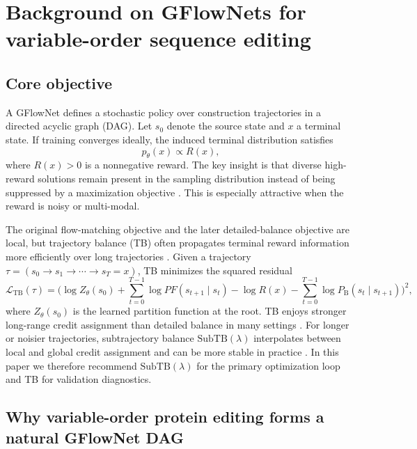 \documentclass[11pt]{article}
\newcommand{\PF}{\ensuremath{PF}}
\newcommand{\PB}{\ensuremath{P_{\mathrm B}}}
\newcommand{\SubTB}{\ensuremath{\mathrm{SubTB}}}
\begin{document}
	
	\section{Background on GFlowNets for variable-order sequence editing}
	\label{sec:gfnbackground}
	
	\subsection{Core objective}
	
	A GFlowNet defines a stochastic policy over construction trajectories in a directed acyclic graph (DAG). Let $s_0$ denote the source state and $x$ a terminal state. If training converges ideally, the induced terminal distribution satisfies
	\begin{equation}
		p_\theta(x) \propto R(x),
	\end{equation}
	where $R(x) > 0$ is a nonnegative reward. The key insight is that diverse high-reward solutions remain present in the sampling distribution instead of being suppressed by a maximization objective \citep{bengio2023gflownet}. This is especially attractive when the reward is noisy or multi-modal.
	
	The original flow-matching objective and the later detailed-balance objective are local, but trajectory balance (TB) often propagates terminal reward information more efficiently over long trajectories \citep{bengio2023gflownet,malkin2022trajectory}. Given a trajectory $\tau=(s_0\rightarrow s_1\rightarrow\cdots\rightarrow s_T=x)$, TB minimizes the squared residual
	\begin{equation}
		\label{eq:tb}
		\mathcal{L}_{\mathrm{TB}}(\tau)=\Bigg(\log Z_\theta(s_0)+\sum_{t=0}^{T-1}\log \PF(s_{t+1}\mid s_t)-\log R(x)-\sum_{t=0}^{T-1}\log \PB(s_t\mid s_{t+1})\Bigg)^2,
	\end{equation}
	where $Z_\theta(s_0)$ is the learned partition function at the root. TB enjoys stronger long-range credit assignment than detailed balance in many settings \citep{malkin2022trajectory}. For longer or noisier trajectories, subtrajectory balance $\SubTB(\lambda)$ interpolates between local and global credit assignment and can be more stable in practice \citep{madan2023subtb}. In this paper we therefore recommend $\SubTB(\lambda)$ for the primary optimization loop and TB for validation diagnostics.
	
	\subsection{Why variable-order protein editing forms a natural GFlowNet DAG}
	
\end{document}
